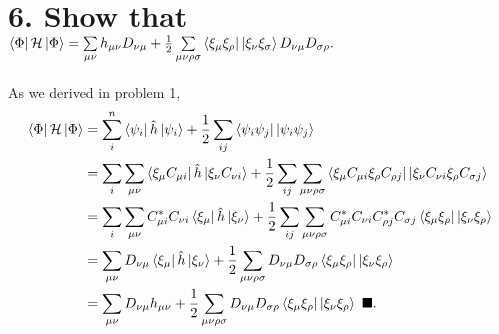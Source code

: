 \documentclass{article}
\newcommand{\suml}{\sum\limits}
\newcommand{\rh}{\ensuremath{\rho}}                %
\newcommand{\sg}{\ensuremath{\sigma}}           %
\begin{document}
\section*{6. Show that $\Bra{\Phi}\mathcal{H} \Ket{\Phi} = \suml_{\mu \nu} h_{\mu \nu} D_{\nu \mu} + \frac{1}{2} \suml_{\mu \nu \rh \sg} \bra{\xi_\mu \xi_\rho} \ket{\xi_\nu \xi_\sigma} D_{\nu \mu} D_{\sigma \rho}.$}
As we derived in problem 1, 
\begin{align*}
\Bra{\Phi} \mathcal{H} \Ket{\Phi} &= \suml_i^n \Bra{\psi_i} \hat{h} \Ket{\psi_i} + \frac{1}{2} \suml_{ij} \bra{\psi_i \psi_j}\ket{\psi_i \psi_j} \\
		      &=\suml_i\suml_{\mu \nu}\Bra{\xi_{\mu} C_{\mu i}} \hat{h} \Ket{\xi_{\nu} C_{\nu i}}+\frac{1}{2} \suml_{ij}\suml_{\mu \nu \rh \sg}\bra{\xi_{\mu}C_{\mu i}\xi_{\rh}C_{\rh j} }\ket{\xi_{\nu} C_{\nu i} \xi_{\rh}C_{\sg j}}\\
		      &=\suml_i\suml_{\mu \nu}C^*_{\mu i}C_{\nu i}\Bra{\xi_{\mu}} \hat{h} \Ket{\xi_{\nu}}+\frac{1}{2} \suml_{ij}\suml_{\mu \nu \rh \sg}C^*_{\mu i}C_{\nu i}C^*_{\rh j}C_{\sg j}\bra{\xi_{\mu}\xi_{\rh} }\ket{\xi_{\nu}\xi_{\rh}}\\
		      &=\suml_{\mu \nu}D_{\nu \mu}\Bra{\xi_{\mu}} \hat{h} \Ket{\xi_{\nu}}+\frac{1}{2} \suml_{\mu \nu \rh \sg}D_{\nu \mu}D_{\sg \rh}\bra{\xi_{\mu}\xi_{\rh} }\ket{\xi_{\nu}\xi_{\rh}}\\
		      &=\suml_{\mu \nu}D_{\nu \mu} h_{\mu \nu} +\frac{1}{2} \suml_{\mu \nu \rh \sg}D_{\nu \mu}D_{\sg \rh}\bra{\xi_{\mu}\xi_{\rh} }\ket{\xi_{\nu}\xi_{\rh}} \, \, \blacksquare. \\
\end{align*}
\end{document}
